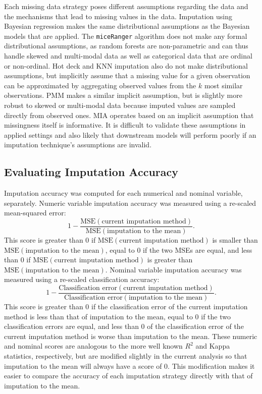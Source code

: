 \documentclass{article}
\begin{document}
Each missing data strategy poses different assumptions regarding the
data and the mechanisms that lead to missing values in the data.
Imputation using Bayesian regression makes the same distributional
assumptions as the Bayesian models that are applied. The
\texttt{miceRanger} algorithm does not make any formal distributional
assumptions, as random forests are non-parametric and can thus handle
skewed and multi-modal data as well as categorical data that are ordinal
or non-ordinal. Hot deck and KNN imputation also do not make
distributional assumptions, but implicitly assume that a missing value
for a given observation can be approximated by aggregating observed
values from the \(k\) most similar observations. PMM makes a similar
implicit assumption, but is slightly more robust to skewed or
multi-modal data because imputed values are sampled directly from
observed ones. MIA operates based on an implicit assumption that
missingness itself is informative. It is difficult to validate these
assumptions in applied settings and also likely that downstream models
will perform poorly if an imputation technique's assumptions are
invalid.

\hypertarget{evaluating-imputation-accuracy}{%
\subsection{Evaluating Imputation
Accuracy}\label{evaluating-imputation-accuracy}}

\label{subsec:imputation_accuracy}

Imputation accuracy was computed for each numerical and nominal
variable, separately. Numeric variable imputation accuracy was measured
using a re-scaled mean-squared error:
\[1 - \frac{\textrm{MSE}(\textrm{current imputation method})}{\textrm{MSE}(\textrm{imputation to the mean})}.\]
This score is greater than 0 if
\(\textrm{MSE}(\textrm{current imputation method})\) is smaller than
\(\textrm{MSE}(\textrm{imputation to the mean})\), equal to 0 if the two
MSEs are equal, and less than 0 if
\(\textrm{MSE}(\textrm{current imputation method})\) is greater than
\(\textrm{MSE}(\textrm{imputation to the mean})\). Nominal variable
imputation accuracy was measured using a re-scaled classification
accuracy:
\[1 - \frac{\textrm{Classification error}(\textrm{current imputation method})}{\textrm{Classification error}(\textrm{imputation to the mean})}.\]
This score is greater than 0 if the classification error of the current
imputation method is less than that of imputation to the mean, equal to
0 if the two classification errors are equal, and less than 0 of the
classification error of the current imputation method is worse than
imputation to the mean. These numeric and nominal scores are analogous
to the more well known \(R^2\) and Kappa statistics, respectively, but
are modified slightly in the current analysis so that imputation to the
mean will always have a score of 0. This modification makes it easier to
compare the accuracy of each imputation strategy directly with that of
imputation to the mean.
\end{document}
